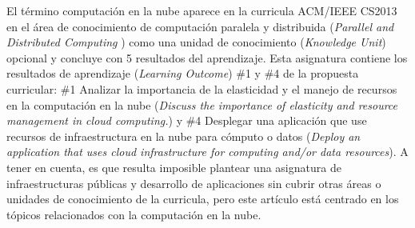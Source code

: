 \documentclass[conference]{IEEEtran}
\begin{document}
El término computación en la nube aparece en la curricula ACM/IEEE CS2013 en el área de conocimiento de computación paralela y distribuida (\textit{Parallel and Distributed Computing} )
como una unidad de conocimiento (\textit{Knowledge Unit}) opcional y concluye con 5 resultados del aprendizaje.
Esta asignatura contiene los resultados de aprendizaje (\textit{Learning Outcome}) \#1 y \#4 de la propuesta curricular: \#1 Analizar la importancia de la elasticidad y el manejo de recursos en la computación en la nube
(\textit{Discuss the importance of elasticity and resource management in cloud computing.}) y
\#4 Desplegar una aplicación que use recursos de infraestructura en la nube para cómputo o datos
(\textit{Deploy an application that uses cloud infrastructure for computing and/or data resources}).
A tener en cuenta, es que resulta imposible plantear una asignatura de infraestructuras públicas y desarrollo de aplicaciones sin cubrir
otras áreas o unidades de conocimiento de la curricula, pero este artículo está centrado en los tópicos relacionados con la computación en la nube.

%
%

\end{document}
